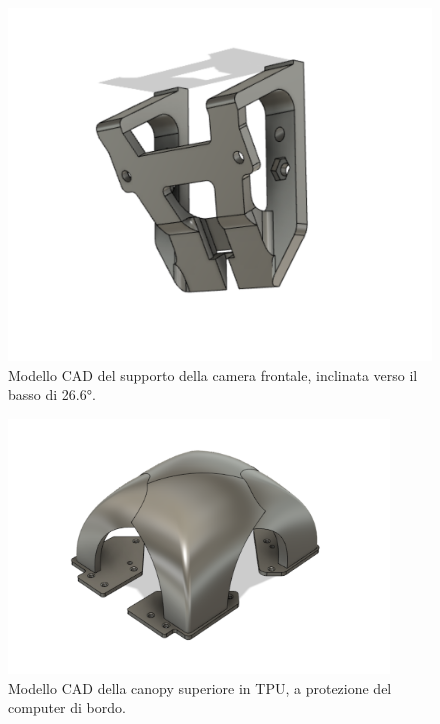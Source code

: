 \begin{figure}
    \centering
    \includegraphics[scale=0.45]{figs/chapter3/camera-holder.png}
    \caption{Modello CAD del supporto della camera frontale, inclinata verso il basso di 26.6°.}
    \label{fig:frontcam}
\end{figure}

\begin{figure}
    \centering
    \includegraphics[width=0.9\textwidth]{figs/chapter3/canopy.png}
    \caption{Modello CAD della canopy superiore in TPU, a protezione del computer di bordo.}
    \label{fig:canopy}
\end{figure}

